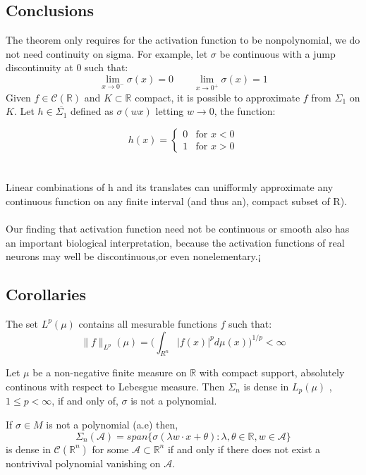 \documentclass[../main.tex]{subfiles}
\begin{document}
\subsection{Conclusions}


	\noindent The theorem only requires for the activation function to be nonpolynomial, we do not need continuity on sigma. For example, let $\sigma$ be continuous with a jump discontinuity at 0 such that: $$\lim_{x\to 0^-} \sigma(x)=0 \qquad \lim_{x \to 0^+} \sigma(x) =1$$
	Given $f \in \mathcal{C}(\mathbb{R})$ and $K \subset \mathbb{R}$ compact, it is possible to approximate $f$ from $\Sigma_1 $ on $K$. Let $h\in \overline{\Sigma_1}$ defined as $\sigma(wx)$ letting $w \rightarrow 0$, the function:
	
	\[
	h(x) = \begin{cases} 
		0 & \text{for } x < 0 \\
		1 & \text{for } x > 0 
	\end{cases}
	\] \\ \\ 
	Linear combinations of h and its translates can unifformly approximate any continuous function on any finite interval (and thus an), compact subset of R).
	\\ \\
	Our finding that activation function need not be continuous or smooth also has an important biological interpretation, because the activation functions of real neurons may well be discontinuous,or even nonelementary.¡
\subsection{Corollaries}


\begin{definition} The set $L^{p}(\mu)$ contains all mesurable functions $f$ such that: 
	$$ \|f\|_{L^p}(\mu) = \Big( \int_{R^n} |f(x)|^p d\mu(x)\Big)^{1/p} < \infty $$
	
\end{definition}

\begin{propo}
	Let $\mu $ be a non-negative finite measure on $\mathbb{R}$ with compact support, absolutely continous with respect to Lebesgue measure. Then $\Sigma_n$ is dense in $L_p(\mu)$ , $1\leq p < \infty$, if and only of, $\sigma$ is not a polynomial.
\end{propo}

\begin{propo}
	If $\sigma\in M$ is not a polynomial (a.e) then, $$ \Sigma_n(\mathcal{A})= span \{ \sigma(\lambda w \cdot x + \theta) : \lambda, \theta \in \mathbb{R}, w \in \mathcal{A} \}$$
	is dense in $\mathcal{C}(\mathbb{R}^n)$ for some $\mathcal{A}\subset \mathbb{R}^n$ if and only if there does not exist a nontrivival polynomial vanishing on $\mathcal{A}$.
\end{propo}


	\cite{leshno1993multilayer}
\end{document}
